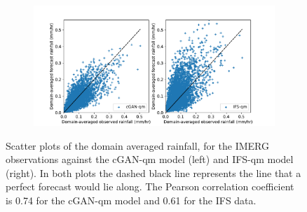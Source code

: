 \documentclass[../main.tex]{subfiles}
\begin{document}
\begin{figure}
\centering
     \begin{subfigure}{\textwidth}
    \centering
     \includegraphics[width=\textwidth]{images/scatter_mean_final-nologs_217600.pdf}
     \caption{}
     \end{subfigure}
     \caption{Scatter plots of the domain averaged rainfall, for the IMERG observations against the cGAN-qm model (left) and IFS-qm model (right). In both plots the dashed black line represents the line that a perfect forecast would lie along. The Pearson correlation coefficient is 0.74 for the cGAN-qm model and 0.61 for the IFS data.}
     \label{fig:bias}
\end{figure}
\end{document}

